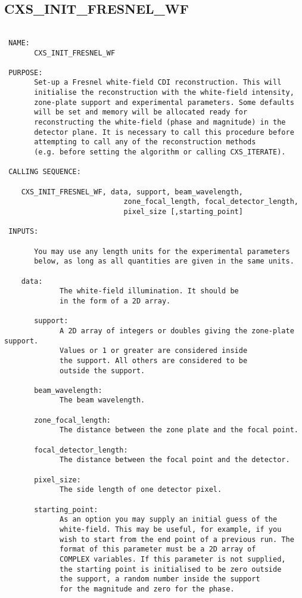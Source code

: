 \subsection{CXS\_INIT\_FRESNEL\_WF}
\begin{verbatim}

 NAME:
       CXS_INIT_FRESNEL_WF

 PURPOSE:
       Set-up a Fresnel white-field CDI reconstruction. This will
       initialise the reconstruction with the white-field intensity, 
       zone-plate support and experimental parameters. Some defaults 
       will be set and memory will be allocated ready for 
       reconstructing the white-field (phase and magnitude) in the
       detector plane. It is necessary to call this procedure before
       attempting to call any of the reconstruction methods
       (e.g. before setting the algorithm or calling CXS_ITERATE).

 CALLING SEQUENCE:

	CXS_INIT_FRESNEL_WF, data, support, beam_wavelength,
                            zone_focal_length, focal_detector_length,
                            pixel_size [,starting_point]

 INPUTS:

       You may use any length units for the experimental parameters
       below, as long as all quantities are given in the same units.

	data: 
             The white-field illumination. It should be
             in the form of a 2D array.

       support: 
             A 2D array of integers or doubles giving the zone-plate support.
             Values or 1 or greater are considered inside
             the support. All others are considered to be
             outside the support.

       beam_wavelength:
             The beam wavelength.

       zone_focal_length:
             The distance between the zone plate and the focal point.

       focal_detector_length:
             The distance between the focal point and the detector.

       pixel_size:
             The side length of one detector pixel.

       starting_point: 
             As an option you may supply an initial guess of the 
             white-field. This may be useful, for example, if you 
             wish to start from the end point of a previous run. The
             format of this parameter must be a 2D array of
             COMPLEX variables. If this parameter is not supplied,
             the starting point is initialised to be zero outside
             the support, a random number inside the support 
             for the magnitude and zero for the phase.


\end{verbatim}
